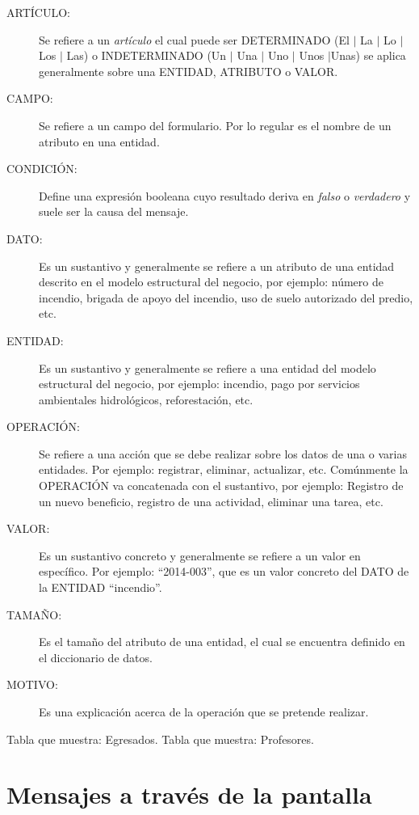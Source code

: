     \begin{description}
	\item [ARTÍCULO:] Se refiere a un {\em artículo} el cual puede ser DETERMINADO (El $\mid$ La $\mid$ Lo $\mid$ Los $\mid$ Las) o INDETERMINADO (Un $\mid$ Una $\mid$ 
	Uno $\mid$ Unos $\mid$Unas) se aplica generalmente sobre una ENTIDAD, ATRIBUTO o VALOR.
	\item [CAMPO:] Se refiere a un campo del formulario. Por lo regular es el nombre de un atributo en una entidad.
	\item [CONDICIÓN:] Define una expresión booleana cuyo resultado deriva en {\em falso} o {\em verdadero} y suele ser la causa del mensaje.
	\item [DATO:] Es un sustantivo y generalmente se refiere a un atributo de una entidad descrito en el modelo estructural del negocio, por ejemplo: número de incendio,
	brigada de apoyo del incendio, uso de suelo autorizado del predio, etc. %
	\item [ENTIDAD:] Es un sustantivo y generalmente se refiere a una entidad del modelo estructural del negocio, por ejemplo: incendio, pago por servicios ambientales hidrológicos, reforestación, etc.
	\item [OPERACIÓN:] Se refiere a una acción que se debe realizar sobre los datos de una o varias entidades. Por ejemplo: registrar, eliminar, actualizar, etc. Comúnmente 
	la OPERACIÓN va concatenada con el sustantivo, por ejemplo: Registro de un nuevo beneficio, registro de una actividad, eliminar una tarea, etc.
	\item [VALOR:] Es un sustantivo concreto y generalmente se refiere a un valor en específico. Por ejemplo: ``2014-003'', que es un valor concreto del DATO de la 
	ENTIDAD ``incendio''.
	\item [TAMAÑO:] Es el tamaño del atributo de una entidad, el cual se encuentra definido en el diccionario de datos.
	\item [MOTIVO:] Es una explicación acerca de la operación que se pretende realizar.
    \end{description}\begin{UClist}
    \UCli Tabla que muestra: Egresados.
    \UCli Tabla que muestra: Profesores.
\end{UClist}


\section{Mensajes a través de la pantalla}



